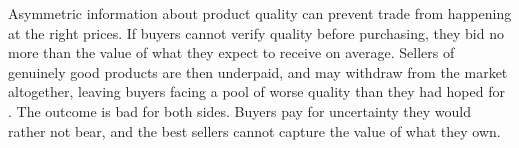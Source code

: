 Asymmetric information about product quality can prevent trade from happening at the right
prices. If buyers cannot verify quality before purchasing, they bid no more than the value of
what they expect to receive on average. Sellers of genuinely good products are then underpaid,
and may withdraw from the market altogether, leaving buyers facing a pool of worse quality than
they had hoped for \citep{akerlof_lemons_1970}. The outcome is bad for both sides. Buyers pay for
uncertainty they would rather not bear, and the best sellers cannot capture the value of what
they own.
